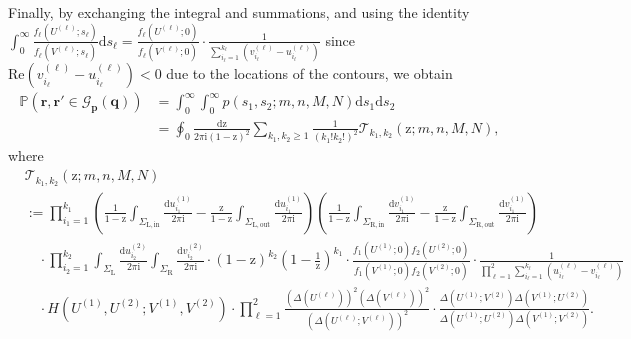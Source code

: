 \documentclass{article}
\numberwithin{equation}{section}
\newcommand{\ddbar}[2]{\frac{{\mathrm d}#1}{2\pi {\mathrm i}#2}}
\newcommand{\gd}{{\mathcal{G}}}
\newcommand{\inn}{\mathrm{in}}
\newcommand{\LL}{\mathrm{L}}
\newcommand{\out}{\mathrm{out}}
\newcommand{\prob}{\mathbb{P}}
\newcommand{\RR}{\mathrm{R}}
\begin{document}
Finally, by exchanging the integral and summations, and using the identity $\int_0^\infty \frac{f_\ell(U^{(\ell)};s_\ell)}{f_\ell(V^{(\ell)};s_\ell)}\mathrm{d}s_\ell =  \frac{f_\ell(U^{(\ell)};0)}{f_\ell(V^{(\ell)};0)}\cdot \frac{1}{\sum_{i_\ell=1}^{k_\ell}(v_{i_\ell}^{(\ell)}-u_{i_\ell}^{(\ell)})}$ since $\mathrm{Re} (v_{i_\ell}^{(\ell)}-u_{i_{\ell}}^{(\ell)})<0$ due to the locations of the contours, we obtain
\begin{equation}
	\label{eq:finite_time_geodesic_distribution}
	\begin{split}
	\prob
	\left(
	\mathbf{r},\mathbf{r}'\in\gd_{\mathbf{p}}(\mathbf{q})
	\right) &= \int_0^\infty\int_0^\infty p(s_1,s_2;m,n,M,N)\mathrm{d}s_1\mathrm{d}s_2 \\
	&= \oint_0\ddbar{\mathrm{z}}{\mathrm{(1-z)^2}}\sum_{k_1,k_2\ge 1}
	\frac{1}{(k_1!k_2!)^2}
	\mathcal{T}_{k_1,k_2}(\mathrm{z};m,n,M,N),
	\end{split}
\end{equation}
where
\begin{equation}
	\label{eq:2021_12_22_01}
	\begin{split}
		&\mathcal{T}_{k_1,k_2}(\mathrm{z};m,n,M,N)\\
		&:=
		\prod_{i_1=1}^{k_1}     
		\left(  \frac{1}{1-\mathrm{z}} \int_{\Sigma_{\LL,\inn}} 	    
		\ddbar{u^{(1)}_{i_1}}{}   
		-\frac{\mathrm{z}}{1-\mathrm{z}} \int_{\Sigma_{\LL,\out}} \ddbar{u^{(1)}_{i_1}}{}
		\right)
		\left(  \frac{1}{1-\mathrm{z}}  \int_{\Sigma_{\RR,\inn}}  
		\ddbar{v^{(1)}_{i_1}}{}
		-\frac{\mathrm{z}}{1-\mathrm{z}}   \int_{\Sigma_{\RR,\out}}
		\ddbar{v^{(1)}_{i_1}}{}
		\right)
		\\
		&\quad \cdot 
		\prod_{i_2=1}^{k_2}  
		\int_{\Sigma_\LL} \ddbar{u^{(2)}_{i_2}}{} 
		\int_{\Sigma_\RR} \ddbar{v^{(2)}_{i_2}}{} 
		\cdot    
		\left(1-\mathrm{z}\right)^{k_2}
		\left(1-\frac{1}{\mathrm{z}}\right)^{k_1}
		\cdot 
		\frac{f_1(U^{(1)};0)f_2(U^{(2)};0)}{f_1(V^{(1)};0)f_2(V^{(2)};0)}
		\cdot
		\frac{1}{\prod_{\ell=1}^2\sum_{i_\ell=1}^{k_\ell} (u_{i_\ell}^{(\ell)}-v_{i_\ell}^{(\ell)})}
		\\
		&\quad \cdot
		H(U^{(1)},U^{(2)};V^{(1)},V^{(2)})\cdot 
		\prod_{\ell=1}^2
		\frac{\left( \Delta(U^{(\ell)}) \right)^2
			\left( \Delta(V^{(\ell)}) \right)^2
		}
		{\left( \Delta(U^{(\ell)}; V^{(\ell)}) \right)^2}
		\cdot 
		\frac{\Delta(U^{(1)};V^{(2)})\Delta(V^{(1)};U^{(2)})}
		{\Delta(U^{(1)};U^{(2)})\Delta(V^{(1)};V^{(2)})}.
	\end{split}
\end{equation}
\end{document}
